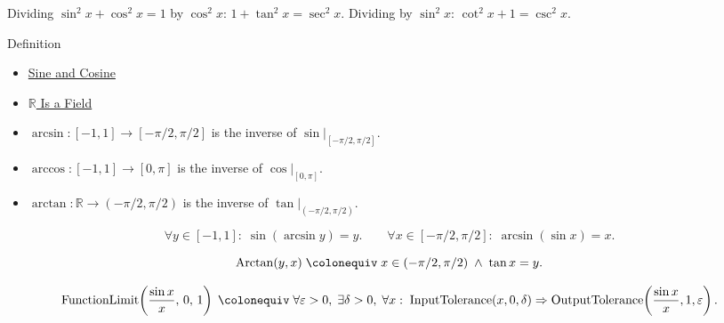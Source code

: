 \begin{remark*}
Dividing $\sin^2 x + \cos^2 x = 1$ by $\cos^2 x$:
$1 + \tan^2 x = \sec^2 x$.
Dividing by $\sin^2 x$: $\cot^2 x + 1 = \csc^2 x$.
\end{remark*}


\begin{definitionbox}{Definition}

\begin{dependencies}
\begin{itemize}
  \item \hyperref[def:sine-cosine]{Sine and Cosine}
  \item \hyperref[thm:r-is-a-field]{$\mathbb{R}$ Is a Field}
\end{itemize}
\end{dependencies}
\begin{definition}
\label{def:inverse-trig}
\begin{itemize}
  \item $\arcsin : [-1,1] \to [-\pi/2, \pi/2]$ is the inverse of
    $\sin\big|_{[-\pi/2,\pi/2]}$.
  \item $\arccos : [-1,1] \to [0,\pi]$ is the inverse of
    $\cos\big|_{[0,\pi]}$.
  \item $\arctan : \mathbb{R} \to (-\pi/2, \pi/2)$ is the inverse
    of $\tan\big|_{(-\pi/2,\pi/2)}$.
\end{itemize}
\end{definition}
\end{definitionbox}\begin{remark*}
\[
  \forall y\in[-1,1]:\;\sin(\arcsin y)=y.
  \qquad
  \forall x\in[-\pi/2,\pi/2]:\;\arcsin(\sin x)=x.
\]
\end{remark*}

\begin{remark*}
\[
  \operatorname{Arctan}(y,x)
  \;\colonequiv\;
  x\in(-\pi/2,\pi/2) \;\wedge\; \tan x = y.
\]
\end{remark*}

\begin{remark*}
\[
  \operatorname{FunctionLimit}\!\left(\frac{\sin x}{x},\,0,\,1\right)
  \;\colonequiv\;
  \forall\varepsilon>0,\;\exists\delta>0,\;\forall x:\;
  \operatorname{InputTolerance}(x,0,\delta)
  \Rightarrow
  \operatorname{OutputTolerance}\!\left(\frac{\sin x}{x},1,\varepsilon\right).
\]
\end{remark*}

